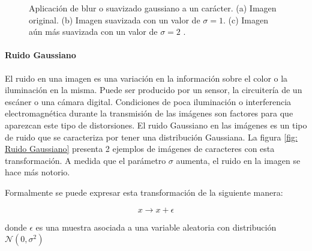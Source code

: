 		\begin{figure}[htbp]
			\centering
			\caption[Suavizado Gaussiano de un carácter]{Aplicación de blur o suavizado gaussiano a un carácter. (a) Imagen original. (b) Imagen suavizada con un valor de $\sigma = 1$.  (c) Imagen aún más suavizada con un valor de $\sigma = 2$ .}
			\label{fig: Suavizado Gaussiano}
		\end{figure}				
			
			
		\paragraph{Ruido Gaussiano}			
			
			El ruido en una imagen es una variación en la información sobre el color o la iluminación en la misma. Puede ser producido por un sensor, la circuitería de un escáner o una cámara digital. Condiciones de poca iluminación o interferencia electromagnética durante la transmisión de las imágenes son factores para que aparezcan este tipo de distorsiones. El ruido Gaussiano en las imágenes es un tipo de ruido que se caracteriza por tener una distribución Gaussiana. La figura \ref{fig: Ruido Gaussiano} presenta 2 ejemplos de imágenes de caracteres con esta transformación. A medida que el parámetro $\sigma$  aumenta, el ruido en la imagen se hace más notorio.
			
			Formalmente se puede expresar esta transformación de la siguiente manera:
			
			$$x \rightarrow x + \epsilon $$
			
			donde $\epsilon$ es una muestra asociada a una variable aleatoria con distribución $\mathcal{N}(0, \sigma^2)$
			
